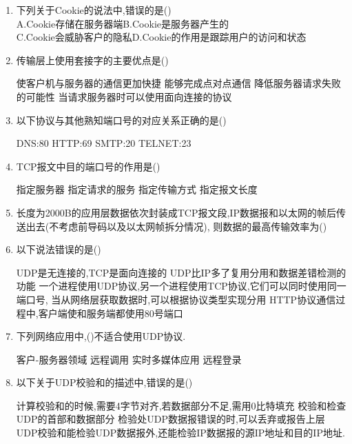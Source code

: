 \documentclass[12pt, a4paper, oneside, UTF8]{ctexbook}
\begin{document}
\begin{enumerate}
    \item 下列关于Cookie的说法中,错误的是() \\
    A.Cookie存储在服务器端\qquad B.Cookie是服务器产生的\\
    C.Cookie会威胁客户的隐私\qquad D.Cookie的作用是跟踪用户的访问和状态

    \item 传输层上使用套接字的主要优点是(\qquad) 
    \begin{choices}[1]
        \task 使客户机与服务器的通信更加快捷 
        \task 能够完成点对点通信
        \task 降低服务器请求失败的可能性
        \task 当请求服务器时可以使用面向连接的协议
    \end{choices}

    \item 以下协议与其他熟知端口号的对应关系正确的是(\qquad)
    \begin{choices}
        \task DNS:80
        \task HTTP:69
        \task SMTP:20
        \task TELNET:23
    \end{choices}

    \item TCP报文中目的端口号的作用是(\qquad)
    \begin{choices}
        \task 指定服务器
        \task 指定请求的服务
        \task 指定传输方式
        \task 指定报文长度
    \end{choices}

    \item 长度为2000B的应用层数据依次封装成TCP报文段,IP数据报和以太网的帧后传送出去(不考虑前导码以及以太网帧拆分情况),
    则数据的最高传输效率为(\qquad)
    
    \item 以下说法错误的是(\qquad)
    \begin{choices}[1]
        \task UDP是无连接的,TCP是面向连接的
        \task UDP比IP多了复用分用和数据差错检测的功能
        \task 一个进程使用UDP协议,另一个进程使用TCP协议,它们可以同时使用同一端口号,
        当从网络层获取数据时,可以根据协议类型实现分用
        \task HTTP协议通信过程中,客户端使和服务端都使用80号端口
    \end{choices}

    \item 下列网络应用中,(\qquad)不适合使用UDP协议. 
    \begin{choices}[2]
        \task 客户-服务器领域
        \task 远程调用
        \task 实时多媒体应用
        \task 远程登录
    \end{choices}

    \item 以下关于UDP校验和的描述中,错误的是(\qquad)
    \begin{choices}[1]
        \task 计算校验和的时候,需要4字节对齐,若数据部分不足,需用0比特填充
        \task 校验和检查UDP的首部和数据部分
        \task 检验处UDP数据报错误的时,可以丢弃或报告上层
        \task UDP校验和能检验UDP数据报外,还能检验IP数据报的源IP地址和目的IP地址.
    \end{choices}


\end{enumerate}
\end{document}
